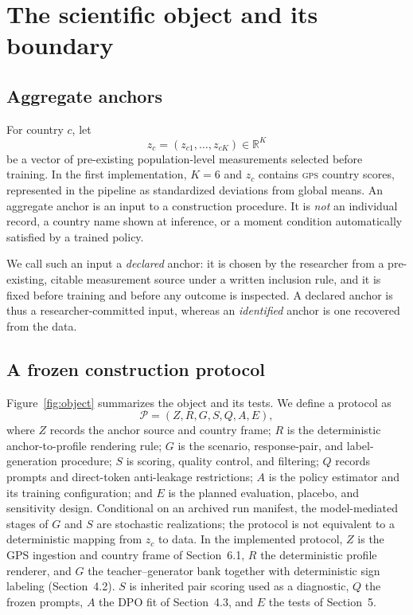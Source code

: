 \documentclass[10pt,letterpaper]{article}
\newcommand{\Pcal}{\mathcal{P}}
\newcommand{\GPS}{\textsc{gps}}
\begin{document}
\section{The scientific object and its boundary}
\subsection{Aggregate anchors}
For country $c$, let
\begin{equation}
z_c=(z_{c1},\ldots,z_{cK})\in\mathbb{R}^K
\label{eq:anchor}
\end{equation}
be a vector of pre-existing population-level measurements selected before training. In the first implementation, $K=6$ and $z_c$ contains \GPS{} country scores, represented in the pipeline as standardized deviations from global means. An aggregate anchor is an input to a construction procedure. It is \emph{not} an individual record, a country name shown at inference, or a moment condition automatically satisfied by a trained policy.

We call such an input a \emph{declared} anchor: it is chosen by the researcher from a pre-existing, citable measurement source under a written inclusion rule, and it is fixed before training and before any outcome is inspected. A declared anchor is thus a researcher-committed input, whereas an \emph{identified} anchor is one recovered from the data.

\subsection{A frozen construction protocol}\label{sec:protocol}
Figure~\ref{fig:object} summarizes the object and its tests. We define a protocol as
\begin{equation}
\Pcal=(Z,R,G,S,Q,A,E),
\label{eq:protocol}
\end{equation}
where $Z$ records the anchor source and country frame; $R$ is the deterministic anchor-to-profile rendering rule; $G$ is the scenario, response-pair, and label-generation procedure; $S$ is scoring, quality control, and filtering; $Q$ records prompts and direct-token anti-leakage restrictions; $A$ is the policy estimator and its training configuration; and $E$ is the planned evaluation, placebo, and sensitivity design. Conditional on an archived run manifest, the model-mediated stages of $G$ and $S$ are stochastic realizations; the protocol is not equivalent to a deterministic mapping from $z_c$ to data. In the implemented protocol, $Z$ is the GPS ingestion and country frame of Section~6.1, $R$ the deterministic profile renderer, and $G$ the teacher--generator bank together with deterministic sign labeling (Section~4.2). $S$ is inherited pair scoring used as a diagnostic, $Q$ the frozen prompts, $A$ the DPO fit of Section~4.3, and $E$ the tests of Section~5.
\end{document}
